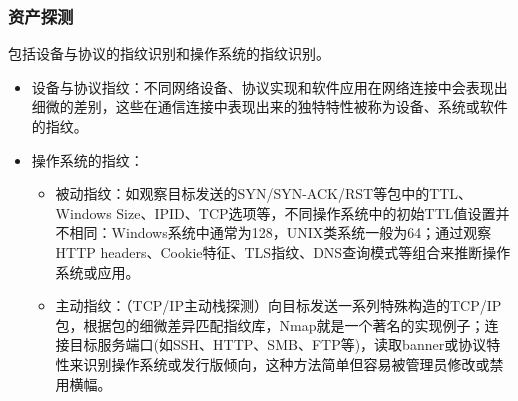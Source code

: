 \subsubsection{资产探测}
包括设备与协议的指纹识别和操作系统的指纹识别。
\begin{itemize}
    \item 设备与协议指纹：不同网络设备、协议实现和软件应用在网络连接中会表现出细微的差别，这些在通信连接中表现出来的独特特性被称为设备、系统或软件的指纹。
    \item 操作系统的指纹：
    \begin{itemize}
        \item 被动指纹：如观察目标发送的SYN/SYN-ACK/RST等包中的TTL、Windows Size、IPID、TCP选项等，不同操作系统中的初始TTL值设置并不相同：Windows系统中通常为128，UNIX类系统一般为64；通过观察HTTP headers、Cookie特征、TLS指纹、DNS查询模式等组合来推断操作系统或应用。
        \item 主动指纹：（TCP/IP主动栈探测）向目标发送一系列特殊构造的TCP/IP包，根据包的细微差异匹配指纹库，Nmap就是一个著名的实现例子；连接目标服务端口(如SSH、HTTP、SMB、FTP等)，读取banner或协议特性来识别操作系统或发行版倾向，这种方法简单但容易被管理员修改或禁用横幅。
    \end{itemize}
\end{itemize}
